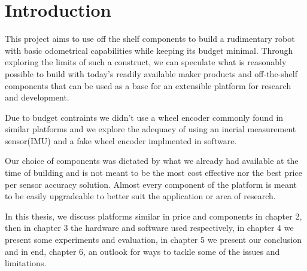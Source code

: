 \documentclass[class=article, crop=false]{standalone}
\begin{document}
\chapter{Introduction}\label{cha:introduction}
This project aims to use off the shelf components to build a rudimentary robot with basic odometrical capabilities while keeping its budget minimal. Through exploring the limits of such a construct, we can speculate what is reasonably possible to build with today's readily available maker products and off-the-shelf components that can be used as a base for an extensible platform for research and development.

Due to budget contraints we didn't use a wheel encoder commonly found in similar platforms and we explore the adequacy of using an inerial measurement sensor(IMU) and a fake wheel encoder implmented in software.

Our choice of components was dictated by what we already had available at the time of building and is not meant to be the most cost effective nor the best price per sensor accuracy solution. Almost every component of the platform is meant to be easily upgradeable to better suit the application or area of research.

In this thesis, we discuss platforms similar in price and components in chapter 2, then in chapter 3 the hardware and software used respectively, in chapter 4 we present some experiments and evaluation, in chapter 5 we present our conclusion and in end, chapter 6, an outlook for ways to tackle some of the issues and limitations.
\end{document}
